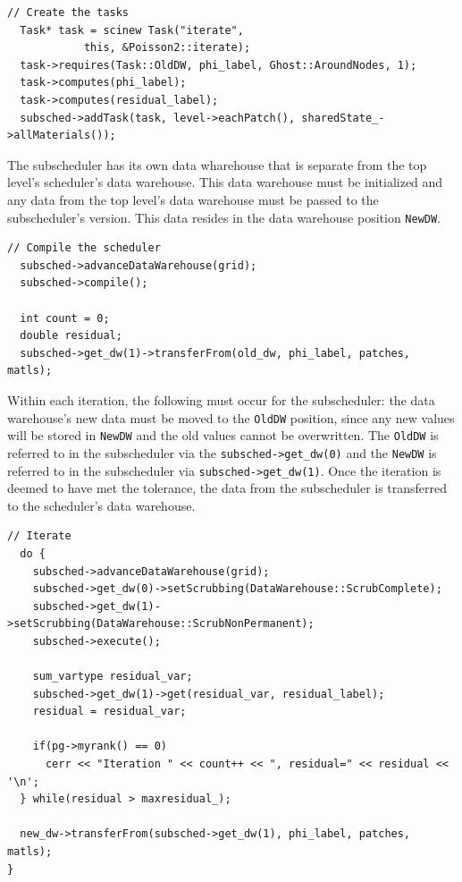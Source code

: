 \documentclass[12pt]{report}
\begin{document}
\begin{Verbatim}[fontsize=\footnotesize]
  // Create the tasks
  Task* task = scinew Task("iterate",
			this, &Poisson2::iterate);
  task->requires(Task::OldDW, phi_label, Ghost::AroundNodes, 1);
  task->computes(phi_label);
  task->computes(residual_label);
  subsched->addTask(task, level->eachPatch(), sharedState_->allMaterials());
\end{Verbatim}

The subscheduler has its own data wharehouse that is separate from the
top level's scheduler's data warehouse.  This data warehouse must be
initialized and any data from the top level's data warehouse must be
passed to the subscheduler's version.  This data resides in the data
warehouse position \texttt{NewDW}.

\begin{Verbatim}[fontsize=\footnotesize]
  // Compile the scheduler
  subsched->advanceDataWarehouse(grid);
  subsched->compile();

  int count = 0;
  double residual;
  subsched->get_dw(1)->transferFrom(old_dw, phi_label, patches, matls);
\end{Verbatim}

Within each iteration, the following must occur for the subscheduler:
the data warehouse's new data must be moved to the \texttt{OldDW}
position, since any new values will be stored in \texttt{NewDW} and
the old values cannot be overwritten.  The \texttt{OldDW} is referred
to in the subscheduler via the \texttt{subsched->get\_dw(0)} and the
\texttt{NewDW} is referred to in the subscheduler via
\texttt{subsched->get\_dw(1)}.  Once the iteration is deemed to have
met the tolerance, the data from the subscheduler is transferred to
the scheduler's data warehouse.

\begin{Verbatim}[fontsize=\footnotesize]
  // Iterate
  do {
    subsched->advanceDataWarehouse(grid);
    subsched->get_dw(0)->setScrubbing(DataWarehouse::ScrubComplete);
    subsched->get_dw(1)->setScrubbing(DataWarehouse::ScrubNonPermanent);
    subsched->execute();    

    sum_vartype residual_var;
    subsched->get_dw(1)->get(residual_var, residual_label);
    residual = residual_var;

    if(pg->myrank() == 0)
      cerr << "Iteration " << count++ << ", residual=" << residual << '\n';
  } while(residual > maxresidual_);

  new_dw->transferFrom(subsched->get_dw(1), phi_label, patches, matls);
}

\end{Verbatim}
\end{document}
